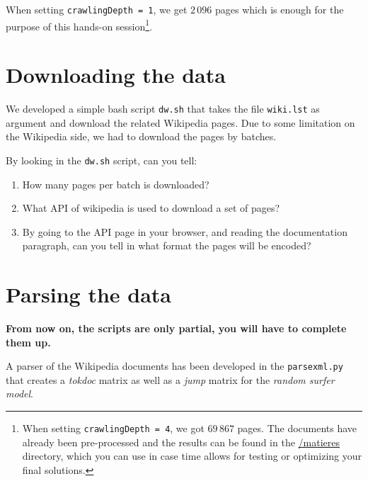 \documentclass[mathserif, 11pt,c]{article}
\begin{document}
When setting \texttt{crawlingDepth = 1}, we get $2\,096$ pages which is enough for the purpose of this hands-on session\footnote{When setting \texttt{crawlingDepth = 4}, we got $69\,867$ pages. The documents have already been pre-processed and the results can be found in the \url{/matieres} directory, which you can use in case time allows for testing or optimizing your final solutions.}.

\section{Downloading the data}

We developed a simple bash script \texttt{dw.sh} that takes the file \texttt{wiki.lst} as argument and download the related Wikipedia pages. Due to some limitation on the Wikipedia side, we had to download the pages by batches.

By looking in the \texttt{dw.sh} script, can you tell:
\begin{enumerate}[label=\textbf{Q\thesection.\arabic*}]
	\item How many pages per batch is downloaded?
	\item What API of wikipedia is used to download a set of pages?
	\item By going to the API page in your browser, and reading the documentation paragraph, can you tell in what format the pages will be encoded?
\end{enumerate}


\section{Parsing the data}

\textbf{From now on, the scripts are only partial, you will have to complete them up.}


A parser of the Wikipedia documents has been developed in the \texttt{parsexml.py} that creates a \textit{tokdoc} matrix as well as a \textit{jump} matrix for the \textit{random surfer model}.
\end{document}
